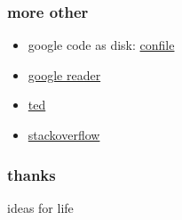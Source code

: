 \documentclass{beamer}
\begin{document}
\begin{frame}
  \frametitle{more other}

  \begin{itemize}
  \item google code as disk:
  \href{http://code.google.com/p/confile/source/browse/\#svn\%2Ftrunk}{confile}
  \item \href{https://www.google.com/reader/view/\#overview-page}{google reader}
  \item \href{http://www.ted.com/}{ted}
\item \href{http://stackoverflow.com/}{stackoverflow}
  \end{itemize}

\end{frame}

















\begin{frame}
  \frametitle{thanks}

  ideas for life \\

\end{frame}








\end{document}
